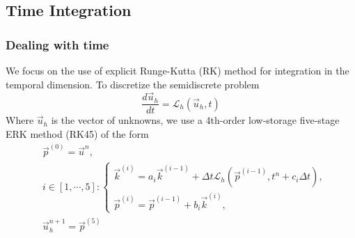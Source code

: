 \subsection{Time Integration}
\begin{frame} \frametitle{Dealing with time}
	We focus on the use of explicit Runge-Kutta (RK) method for integration in the temporal dimension. To discretize the semidiscrete problem
	\begin{equation}
		\frac{d\vec{u}_h}{dt} = \mathcal{L}_h(\vec{u}_h,t)
	\label{eq:semidiscrete_problem}
	\end{equation}
	Where $\vec{u}_h$ is the vector of unknowns, we use a 4th-order low-storage five-stage ERK method (RK45) of the form
	\begin{equation}
		\begin{split}
		&\vec{p}^{(0)} = \vec{u}^n, \\
		&i \in [1,\cdots,5]: 
		\begin{cases}
			\vec{k}^{(i)} = a_i \vec{k}^{(i-1)} + \Delta t \mathcal{L}_h(\vec{p}^{(i-1)},t^n+c_i \Delta t), \\
			\vec{p}^{(i)} = \vec{p}^{(i-1)} + b_i \vec{k}^{(i)},
		\end{cases}\\
		&\vec{u}_h^{n+1} = \vec{p}^{(5)} 
	\end{split}
	\end{equation}
\end{frame}